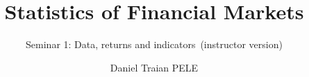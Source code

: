 \title[Statistics of Financial Markets]{Statistics of Financial Markets}
\subtitle{Seminar 1: Data, returns and indicators\ifsolutions\ (instructor version)\fi}
\author[D.T. Pele]{Daniel Traian PELE}
\date{}

\providecommand{\sfmapplink}[3]{\hypertarget{#2}{}\hyperlink{#1}{\beamergotobutton{#3}}}  %
\providecommand{\sfmappback}[2]{\begin{tikzpicture}[remember picture,overlay]\node[anchor=south east] at ([xshift=-3mm,yshift=7mm]current page.south east){\hyperlink{#1}{\beamerreturnbutton{#2}}};\end{tikzpicture}}  %
\providecommand{\sfmchlink}[2]{\href{#1}{#2}}  %
\providecommand{\sfmchlinkt}[2]{\href{#1}{\usebeamercolor[fg]{frametitle}#2}}  %


